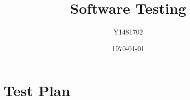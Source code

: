 \documentclass[11pt]{article}
\title{Software Testing}
\author{Y1481702}
\date{\today}
\begin{document}
\begin{titlepage}
\clearpage\maketitle
\thispagestyle{empty}
\tableofcontents
\end{titlepage}






\section{Test Plan}%
\end{document}
